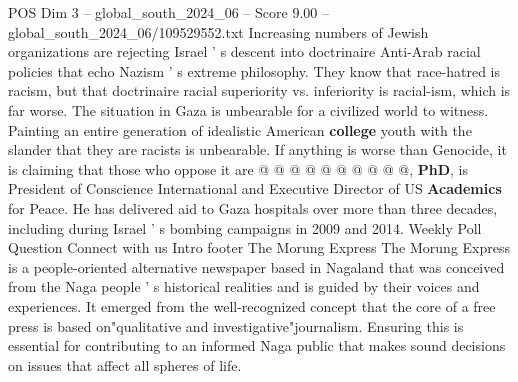 \begin{textsample}{POS Dim 3 – global\_south\_2024\_06 – Score 9.00 – global\_south\_2024\_06/109529552.txt}
Increasing numbers of Jewish organizations are rejecting Israel ' s descent into doctrinaire Anti-Arab racial policies that echo Nazism ' s extreme philosophy.
They know that race-hatred is racism, but that doctrinaire racial superiority vs. inferiority is racial-ism, which is far worse.
The situation in Gaza is unbearable for a civilized world to witness.
Painting an entire generation of idealistic American \textbf{college} youth with the slander that they are racists is unbearable.
If anything is worse than Genocide, it is claiming that those who oppose it are @ @ @ @ @ @ @ @ @ @, \textbf{PhD}, is President of Conscience International and Executive Director of US \textbf{Academics} for Peace.
He has delivered aid to Gaza hospitals over more than three decades, including during Israel ' s bombing campaigns in 2009 and 2014.
Weekly Poll Question Connect with us Intro footer The Morung Express The Morung Express is a people-oriented alternative newspaper based in Nagaland that was conceived from the Naga people ' s historical realities and is guided by their voices and experiences.
It emerged from the well-recognized concept that the core of a free press is based on"qualitative and investigative"journalism.
Ensuring this is essential for contributing to an informed Naga public that makes sound decisions on issues that affect all spheres of life.

\end{textsample}
